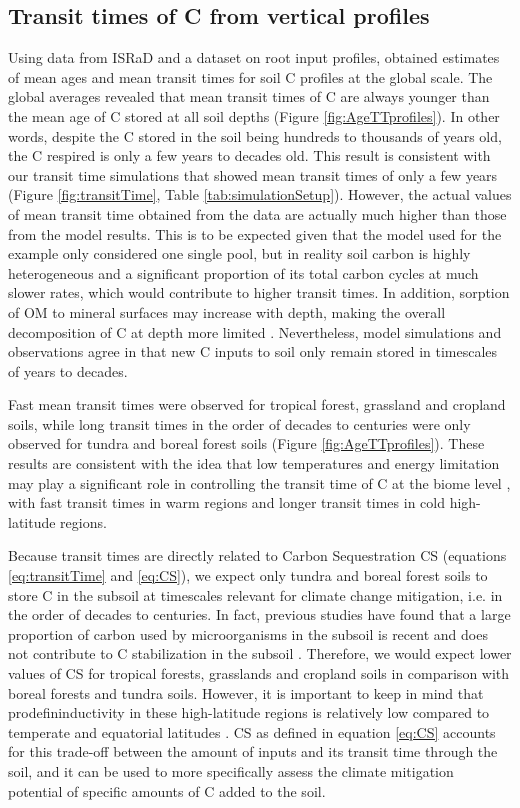 \documentclass[11pt, oneside, a4paper]{article}   	%
\begin{document}
\subsection{Transit times of C from vertical profiles}
Using data from ISRaD and a dataset on root input profiles, \citet{Xiao2022} obtained estimates of mean ages and mean transit times for soil C profiles at the global scale. The global averages revealed that mean transit times of C are always younger than the mean age of C stored at all soil depths (Figure \ref{fig:AgeTTprofiles}). In other words, despite the C stored in the soil being hundreds to thousands of years old, the C respired is only a few years to decades old. This result is consistent with our transit time simulations that showed mean transit times of only a few years (Figure \ref{fig:transitTime}, Table \ref{tab:simulationSetup}). However, the actual values of mean transit time obtained from the data are actually much higher than those from the model results. This is to be expected given that the model used for the example only considered one single pool, but in reality soil carbon is highly heterogeneous and a significant proportion of its total carbon cycles at much slower rates, which would contribute to higher transit times.  In addition, sorption of OM to mineral surfaces may increase with depth, making the overall decomposition of C at depth more limited \citep{Ahrens2020}. Nevertheless, model simulations and observations agree in that new C inputs to soil only remain stored in timescales of years to decades. 

Fast mean transit times were observed for tropical forest, grassland and cropland soils, while long transit times in the order of decades to centuries were only observed for tundra and boreal forest soils (Figure \ref{fig:AgeTTprofiles}). These results are consistent with the idea that low temperatures and energy limitation may play a significant role in controlling the transit time of C at the biome level \citep{Lu2018, Xiao2022}, with fast transit times in warm regions and longer transit times in cold high-latitude regions.

Because transit times are directly related to Carbon Sequestration CS (equations \ref{eq:transitTime} and \ref{eq:CS}), we expect only tundra and boreal forest soils to store C in the subsoil at timescales relevant for climate change mitigation, i.e. in the order of decades to centuries. In fact, previous studies have found that a large proportion of carbon used by microorganisms in the subsoil is recent and does not contribute to C stabilization in the subsoil \citep{Balesdent2018, Scheibe2023}. Therefore, we would expect lower values of CS for tropical forests, grasslands and cropland soils in comparison with boreal forests and tundra soils. 
However, it is important to keep in mind that prodefininductivity in these high-latitude regions is relatively low compared to temperate and equatorial latitudes \citep{Xiao2023}. CS as defined in equation \ref{eq:CS} accounts for this trade-off between the amount of inputs and its transit time through the soil, and it can be used to more specifically assess the climate mitigation potential of specific amounts of C added to the soil.
\end{document}
